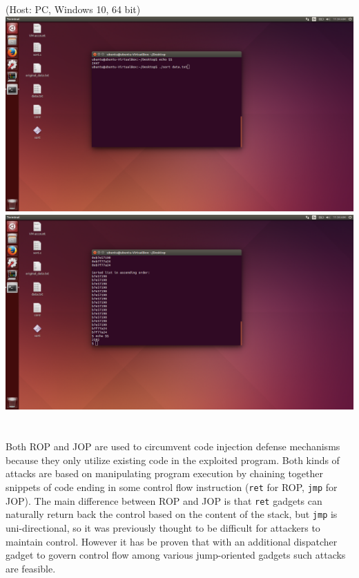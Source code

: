 \documentclass{article}
\begin{document}
\section{}
(Host: PC, Windows 10, 64 bit)\\
\includegraphics[width=\textwidth]{before.png}\\
\includegraphics[width=\textwidth]{after.png}
\newpage
\section{}
Both ROP and JOP are used to circumvent code injection defense mechanisms because they only utilize existing code in the exploited program. Both kinds of attacks are based on manipulating program execution by chaining together snippets of code ending in some control flow instruction (\texttt{ret} for ROP, \texttt{jmp} for JOP). The main difference between ROP and JOP is that \texttt{ret} gadgets can naturally return back the control based on the content of the stack, but \texttt{jmp} is uni-directional, so it was previously thought to be difficult for attackers to maintain control. However it has be proven that with an additional dispatcher gadget to govern control flow among various jump-oriented gadgets such attacks are feasible.
\end{document}
